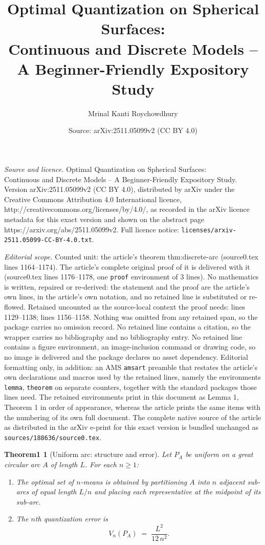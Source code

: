 \documentclass[10pt,a4paper]{amsart}
\title{Optimal Quantization on Spherical Surfaces: \\ Continuous and Discrete Models -- A Beginner-Friendly Expository Study}
\author{Mrinal Kanti Roychowdhury}
\date{Source: arXiv:2511.05099v2 (CC BY 4.0)}
\newtheorem{theorem1}{Theorem1}
\begin{document}
\maketitle

\noindent\emph{Source and licence.} Optimal Quantization on Spherical Surfaces: \\ Continuous and Discrete Models -- A Beginner-Friendly Expository Study. Version arXiv:2511.05099v2 (CC BY 4.0), distributed by arXiv under the Creative Commons Attribution 4.0 International licence, http://creativecommons.org/licenses/by/4.0/, as recorded in the arXiv licence metadata for this exact version and shown on the abstract page https://arxiv.org/abs/2511.05099v2. Full licence notice: \texttt{licenses/arxiv-2511.05099-CC-BY-4.0.txt}.\par\smallskip

\noindent\textit{Editorial scope.} Counted unit: the article's theorem thm:discrete-arc (source0.tex lines 1164--1174). The article's complete original proof of it is delivered with it (source0.tex lines 1176--1178, one \texttt{proof} environment of 3 lines). No mathematics is written, repaired or re-derived: the statement and the proof are the article's own lines, in the article's own notation, and no retained line is substituted or re-flowed.  Retained uncounted as the source-local context the proof needs: lines 1129--1138; lines 1156--1158.  Nothing was omitted from any retained span, so the package carries no omission record.  No retained line contains a citation, so the wrapper carries no bibliography and no bibliography entry.  No retained line contains a figure environment, an image-inclusion command or drawing code, so no image is delivered and the package declares no asset dependency.  Editorial formatting only, in addition: an AMS \texttt{amsart} preamble that restates the article's own declarations and macros used by the retained lines, namely the environments \texttt{lemma}, \texttt{theorem} on separate counters, together with the standard packages those lines need.  The retained environments print in this document as Lemma 1, Theorem 1 in order of appearance, whereas the article prints the same items with the numbering of its own full document.  The complete native source of the article as distributed in the arXiv e-print for this exact version is bundled unchanged as \texttt{sources/188636/source0.tex}.
\begin{theorem1}[Uniform arc: structure and error]\label{thm:arc-continuous}
Let $P_A$ be uniform on a great circular arc $A$ of length $L$. For each $n\ge 1$:
\begin{enumerate}[label=(\roman*), leftmargin=1.5em]
  \item The optimal set of $n$-means is obtained by partitioning $A$ into $n$ adjacent sub-arcs of equal length $L/n$ and placing each representative at the midpoint of its sub-arc.
  \item The $n$th quantization error is
  \[
  V_n(P_A)\;=\;\frac{L^2}{12\,n^2}.
  \]
\end{enumerate}
\end{theorem1}
\end{document}
